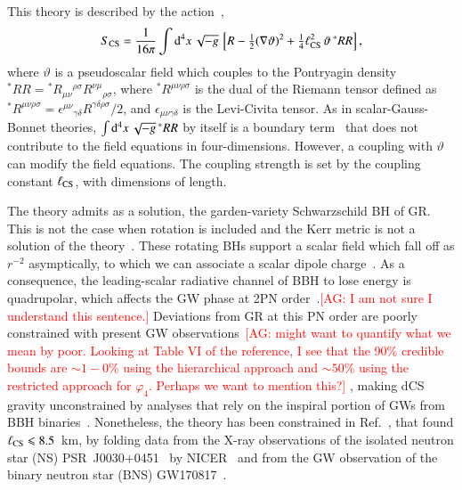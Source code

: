 \documentclass[twocolumn,
               prd,
               aps,
               superscriptaddress,
               tightenlines,
               nofootinbib,
               eqsecnum,
               amsfonts,
               amsmath,
               longbibliography]{revtex4-1}
\newcommand{\dV}{{\rm d}^{4}x \, \sqrt{-g} \,}
\newcommand{\agcomm}[1]{{\textcolor{red}{{[AG: #1]}} }}
\begin{document}
This theory is described by the action~\cite{Jackiw:2003pm,Alexander:2009tp},
%
\begin{equation} \label{eq:action_dcs}
    S_{\rm CS} = \frac{1}{16 \pi}
    \int \dV
    \left[
    R - \tfrac{1}{2}(\nabla \vartheta)^2
    + \tfrac{1}{4} \ell^{2}_{\rm CS} \, \vartheta \, {}^{*}RR
    \right],
\end{equation}
%
where $\vartheta$ is a pseudoscalar field which couples to the Pontryagin
density
${}^{*}RR = {}^{*}R_{\mu\nu}{}^{\rho\sigma} R^{\nu\mu}{}_{\rho\sigma}$,
%
where ${}^{*}R^{\mu\nu\rho\sigma}$ is the dual of the Riemann tensor
defined as
%
${}^{*}R^{\mu\nu\rho\sigma} =
\epsilon^{\mu\nu}{}_{\gamma\delta}
R^{\gamma\delta\rho\sigma} / 2$,
%
and $\epsilon_{\mu\nu\gamma\delta}$ is the Levi-Civita tensor.
%
As in scalar-Gauss-Bonnet theories, $\int \dV {}^{*}RR$ by itself is a boundary
term~\cite{Jackiw:2003pm} that does not contribute to the field equations in
four-dimensions.
%
However, a coupling with $\vartheta$ can modify the field equations.
%
The coupling strength is set by the coupling constant $\ell_{\rm CS}$, with
dimensions of length.

The theory admits as a solution, the garden-variety Schwarzschild BH of GR. This
is not the case when rotation is included and the Kerr metric is not a solution of
the theory~\cite{Jackiw:2003pm}.
%
These rotating BHs support a scalar field which fall off as
$r^{-2}$ asymptically, to which we can associate a scalar dipole
charge~\cite{Yunes:2009hc,Konno:2009kg}.
%
As a consequence, the leading-scalar radiative channel of BBH to lose energy is quadrupolar,
which affects the GW phase at 2PN order~\cite{Yagi:2011xp,Alexander:2017jmt}.\agcomm{I am not sure I understand this sentence.}
%
Deviations from GR at this PN order are poorly constrained with present GW
observations~\cite{LIGOScientific:2021sio}\agcomm{might want to quantify what we mean by poor. Looking at Table VI of the reference, I see that the 90\% credible bounds are $\sim 1-0\%$ using the hierarchical approach and $\sim 50\%$ using the restricted approach for $\varphi_4$. Perhaps we want to mention this?}, making dCS gravity unconstrained by
analyses that rely on the inspiral portion of GWs from BBH
binaries~\cite{Nair:2019iur,Perkins:2021mhb}.
%
Nonetheless, the theory has been constrained in Ref.~\cite{Silva:2020acr}, that found
%
$\ell_{\rm CS} \leqslant 8.5$~km,
%
by folding data from the X-ray observations of the isolated neutron star (NS)
PSR~J0030+0451~\cite{Lommen:2000yt,NANOGrav:2017wvv} by
NICER~\cite{Riley:2019yda,Miller:2019cac} and from the GW observation of the binary
neutron star (BNS) GW170817~\cite{TheLIGOScientific:2017qsa,LIGOScientific:2018cki}.
\end{document}
